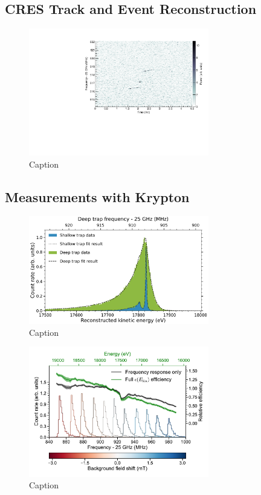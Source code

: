 \subsection{CRES Track and Event Reconstruction}

\begin{figure}[htbp]
    \centering
    \includegraphics[width=0.7\textwidth]{figs/Chapter-3/T2_Event0.pdf}
    \caption{Caption}
    \label{fig:tritium_event0}
\end{figure}

\subsection{Measurements with Krypton}

\begin{figure}[htbp]
    \centering
    \includegraphics[width=0.7\textwidth]{figs/Chapter-3/kr_fit.pdf}
    \caption{Caption}
    \label{fig:krypton_fit}
\end{figure}

\begin{figure}[htbp]
    \centering
    \includegraphics[width=0.7\textwidth]{figs/Chapter-3/fss_for_prl_plot.pdf}
    \caption{Caption}
    \label{fig:fss_plot}
\end{figure}

